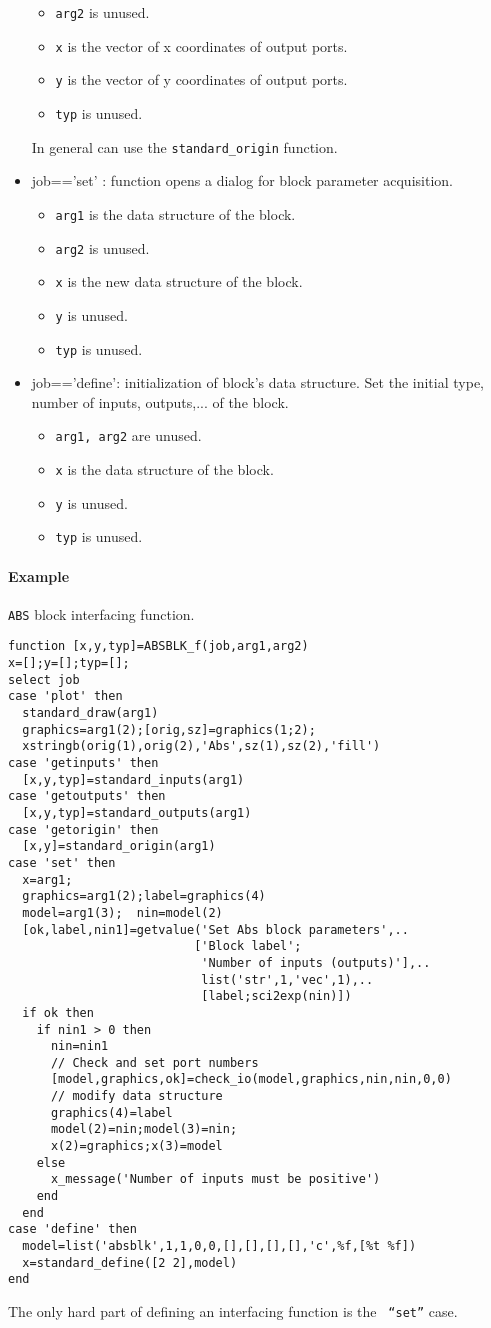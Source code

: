 \begin{itemize}
\begin{itemize}
  \item  {\tt arg2} is unused.
  \item {\tt x} is the vector of x coordinates of output ports.
  \item {\tt y} is the vector of y coordinates of output ports.
  \item {\tt typ} is unused.
  \end{itemize}
In general can use the {\tt standard\_origin} function.
\item job=='set' : function opens a dialog for block parameter
  acquisition. 
  \begin{itemize}
  \item  {\tt arg1} is the data structure of the block. 
  \item  {\tt arg2} is unused.
  \item {\tt x} is the new data structure of the block.
  \item {\tt y} is unused.
  \item {\tt typ} is unused.
  \end{itemize}
\item  job=='define': initialization of block's data
  structure. Set the initial type, number of inputs, outputs,... of
  the block.
  \begin{itemize}
  \item  {\tt arg1, arg2} are unused.
  \item {\tt x} is the data structure of the block.
  \item {\tt y} is unused.
  \item {\tt typ} is unused.
  \end{itemize}
\end{itemize}
\paragraph{Example}
{\tt ABS} block interfacing function.
\begin{verbatim}
function [x,y,typ]=ABSBLK_f(job,arg1,arg2)
x=[];y=[];typ=[];
select job
case 'plot' then
  standard_draw(arg1)
  graphics=arg1(2);[orig,sz]=graphics(1;2);
  xstringb(orig(1),orig(2),'Abs',sz(1),sz(2),'fill')
case 'getinputs' then
  [x,y,typ]=standard_inputs(arg1)
case 'getoutputs' then
  [x,y,typ]=standard_outputs(arg1)
case 'getorigin' then
  [x,y]=standard_origin(arg1)
case 'set' then
  x=arg1;
  graphics=arg1(2);label=graphics(4)
  model=arg1(3);  nin=model(2)
  [ok,label,nin1]=getvalue('Set Abs block parameters',..
                          ['Block label';
                           'Number of inputs (outputs)'],..
                           list('str',1,'vec',1),..
                           [label;sci2exp(nin)])
  if ok then 
    if nin1 > 0 then
      nin=nin1
      // Check and set port numbers
      [model,graphics,ok]=check_io(model,graphics,nin,nin,0,0)
      // modify data structure
      graphics(4)=label
      model(2)=nin;model(3)=nin;
      x(2)=graphics;x(3)=model
    else        
      x_message('Number of inputs must be positive')
    end
  end
case 'define' then
  model=list('absblk',1,1,0,0,[],[],[],[],'c',%f,[%t %f])
  x=standard_define([2 2],model)
end
\end{verbatim}
The only hard part of defining an interfacing function is the {\tt
  ``set''} case.
